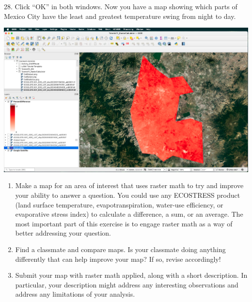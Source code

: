 \documentclass[oneside,a4paper,11pt,explicit]{book}
\begin{document}
28. Click ``OK'' in both windows. Now you have a map showing which parts of Mexico City have the least and greatest temperature swing from night to day. 

\vspace{.5em}

\centerline{\includegraphics[width=\textwidth]{PercentDifferenceFinal.png}}

\begin{tcolorbox}[colback=yellow!5!white,colframe=MACred,title= \vspace{.2em} \Large Make a Map Assignments]
	\large
	\begin{enumerate}
		\item Make a map for an area of interest that uses raster math to try and improve your ability to answer a question. You could use any ECOSTRESS product (land surface temperature, evapotranspiration, water-use efficiency, or evaporative stress index) to calculate a difference, a sum, or an average. The most important part of this exercise is to engage raster math as a way of better addressing your question. 
		\item Find a classmate and compare maps. Is your classmate doing anything differently that can help improve your map? If so, revise accordingly! 
            \item Submit your map with raster math applied, along with a short description. In particular, your description might address any interesting observations and address any limitations of your analysis.
	\end{enumerate}
\end{tcolorbox}
\end{document}
